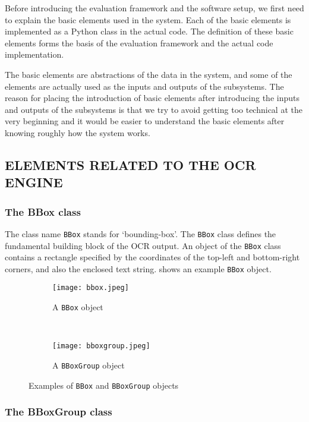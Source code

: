 \documentclass[12pt]{article}
\begin{document}
Before introducing the evaluation framework and the software setup, we first need to explain the basic elements used in the system. Each of the basic elements is implemented as a Python class in the actual code. The definition of these basic elements forms the basis of the evaluation framework and the actual code implementation.

The basic elements are abstractions of the data in the system, and some of the elements are actually used as the inputs and outputs of the subsystems. The reason for placing the introduction of basic elements after introducing the inputs and outputs of the subsystems is that we try to avoid getting too technical at the very beginning and it would be easier to understand the basic elements after knowing roughly how the system works. 

\subsection{ELEMENTS RELATED TO THE OCR ENGINE}

\subsubsection{The BBox class}

The class name \texttt{BBox} stands for `bounding-box'. The \texttt{BBox} class defines the fundamental building block of the OCR output. An object of the \texttt{BBox} class contains a rectangle specified by the coordinates of the top-left and bottom-right corners, and also the enclosed text string.  shows an example \texttt{BBox} object. 

\begin{figure}[ht]
    \centering
    \begin{subfigure}[t]{0.49\textwidth}
        \centering
        \texttt{[image: bbox.jpeg]}
        \caption{A \texttt{BBox} object}
        \label{fig:bbox-example}
    \end{subfigure}%
    ~ 
    \begin{subfigure}[t]{0.49\textwidth}
        \centering
        \texttt{[image: bboxgroup.jpeg]}
        \caption{A \texttt{BBoxGroup} object}
        \label{fig:bboxgroup-example}
    \end{subfigure}
    \caption{Examples of \texttt{BBox} and \texttt{BBoxGroup} objects}
\end{figure}

\subsubsection{The BBoxGroup class}
\end{document}

